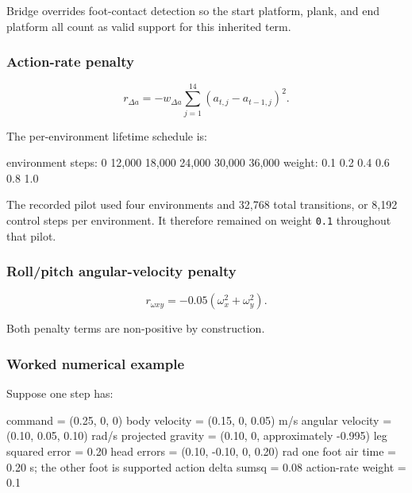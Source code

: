 \documentclass[
  american,
  11pt,
  letterpaper,
]{article}
\newenvironment{Shaded}{\begin{snugshade}}{\end{snugshade}}
\newcommand{\NormalTok}[1]{#1}
\renewenvironment{Shaded}{\par\smallskip}{\par\smallskip}
\begin{document}
Bridge overrides foot-contact detection so the start platform, plank,
and end platform all count as valid support for this inherited term.

\subsubsection{Action-rate penalty}\label{action-rate-penalty}

\[
r_{\Delta a}
=-w_{\Delta a}
\sum_{j=1}^{14}(a_{t,j}-a_{t-1,j})^2.
\]

The per-environment lifetime schedule is:

\begin{Shaded}
\begin{Highlighting}[]
\NormalTok{environment steps:  0     12,000  18,000  24,000  30,000  36,000}
\NormalTok{weight:             0.1   0.2     0.4     0.6     0.8     1.0}
\end{Highlighting}
\end{Shaded}

The recorded pilot used four environments and 32,768 total transitions,
or 8,192 control steps per environment. It therefore remained on weight
\texttt{0.1} throughout that pilot.

\subsubsection{Roll/pitch angular-velocity
penalty}\label{rollpitch-angular-velocity-penalty}

\[
r_{\omega xy}
=-0.05(\omega_x^2+\omega_y^2).
\]

Both penalty terms are non-positive by construction.

\subsubsection{Worked numerical example}\label{worked-numerical-example}

Suppose one step has:

\begin{Shaded}
\begin{Highlighting}[]
\NormalTok{command             = (0.25, 0, 0)}
\NormalTok{body velocity       = (0.15, 0, 0.05) m/s}
\NormalTok{angular velocity    = (0.10, 0.05, 0.10) rad/s}
\NormalTok{projected gravity   = (0.10, 0, approximately {-}0.995)}
\NormalTok{leg squared error   = 0.20}
\NormalTok{head errors         = (0.10, {-}0.10, 0, 0.20) rad}
\NormalTok{one foot air time   = 0.20 s; the other foot is supported}
\NormalTok{action delta sumsq  = 0.08}
\NormalTok{action{-}rate weight  = 0.1}
\end{Highlighting}
\end{Shaded}
\end{document}
